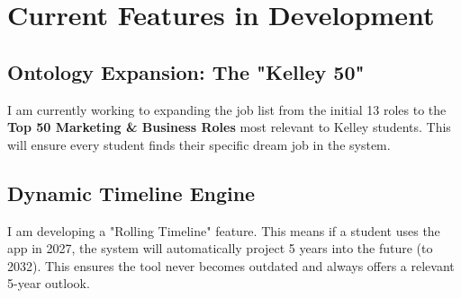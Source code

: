 \documentclass[11pt, letterpaper]{article}
\begin{document}
\section{Current Features in Development}

\subsection{Ontology Expansion: The "Kelley 50"}
I am currently working to expanding the job list from the initial 13 roles to the \textbf{Top 50 Marketing \& Business Roles} most relevant to Kelley students. This will ensure every student finds their specific dream job in the system.

\subsection{Dynamic Timeline Engine}
I am developing a "Rolling Timeline" feature. This means if a student uses the app in 2027, the system will automatically project 5 years into the future (to 2032). This ensures the tool never becomes outdated and always offers a relevant 5-year outlook.
\end{document}
